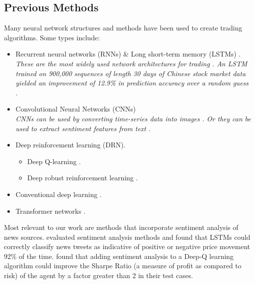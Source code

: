 \documentclass[conference]{IEEEtran}
\begin{document}
\subsection{Previous Methods}
Many neural network structures and methods have been used to create trading algorithms. Some types include: 
\begin{itemize}
    \item Recurrent neural networks (RNNs) \& Long short-term memory (LSTMs) \cite{Chen2017}\cite{Mehta2021}.
          \\\emph{These are the most widely used network architectures for trading \cite{Gu2020}. An LSTM trained on 900,000 sequences of length 30 days of Chinese stock market data yielded an improvement of 12.9\% in prediction accuracy over a random guess \cite{Chen2015}.}
    \item Convolutional Neural Networks (CNNs) \cite{Gu2020}
          \\\emph{CNNs can be used by converting time-series data into images \cite{Sezer2018}. Or they can be used to extract sentiment features from text \cite{Shi2020}.}
    \item Deep reinforcement learning (DRN).
          \begin{itemize}
            \item Deep Q-learning \cite{Wang2017} \cite{Nan2020}.
            \item Deep robust reinforcement learning \cite{Li2019}.
          \end{itemize}
    \item Conventional deep learning \cite{Day2016}.
    \item Transformer networks \cite{Schmitz2020}.
\end{itemize}

Most relevant to our work are methods that incorporate sentiment analysis of news sources. \cite{Mehta2021} evaluated sentiment analysis methods and found that LSTMs could correctly classify news tweets as indicative of positive or negative price movement 92\% of the time. \cite{Nan2020} found that adding sentiment analysis to a Deep-Q learning algorithm could improve the Sharpe Ratio (a measure of profit as compared to risk) of the agent by a factor greater than 2 in their test cases.
\end{document}
